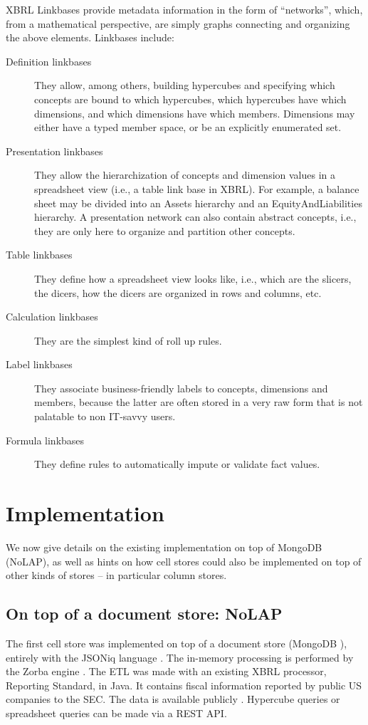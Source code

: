 \documentclass{acm_proc_article-sp}
\begin{document}
XBRL Linkbases provide metadata information in the form of ``networks'', which, from a mathematical perspective, are simply graphs connecting and organizing the above elements. Linkbases include:

\begin{description}
\item[Definition linkbases] They allow, among others, building hypercubes and specifying which concepts are bound to which hypercubes, which hypercubes have which dimensions, and which dimensions have which members. Dimensions may either have a typed member space, or be an explicitly enumerated set. 
\item[Presentation linkbases] They allow the hierarchization of concepts and dimension values in a spreadsheet view (i.e., a table link base in XBRL). For example, a balance sheet may be divided into an Assets hierarchy and an EquityAndLiabilities hierarchy. A presentation network can also contain abstract concepts, i.e., they are only here to organize and partition other concepts. 
\item[Table linkbases] They define how a spreadsheet view looks like, i.e., which are the slicers, the dicers, how the dicers are organized in rows and columns, etc.
\item[Calculation linkbases] They are the simplest kind of roll up rules.
\item[Label linkbases] They associate business-friendly labels to concepts, dimensions and members, because the latter are often stored in a very raw form that is not palatable to non IT-savvy users.
\item[Formula linkbases] They define rules to automatically impute or validate fact values.
\end{description}

\section{Implementation}
We now give details on the existing implementation on top of MongoDB (NoLAP), as well as hints on how cell stores could also be implemented on top of other kinds of stores -- in particular column stores.
\label{section-implementation}

\subsection{On top of a document store: NoLAP}

The first cell store was implemented on top of a document store (MongoDB \cite{MongoDB}), entirely with the JSONiq language \cite{JSONiq}. The in-memory processing is performed by the Zorba engine \cite{Zorba}. The ETL was made with an existing XBRL processor, Reporting Standard, in Java. It contains fiscal information reported by public US companies to the SEC. The data is available publicly \cite{SECXBRL.info}. Hypercube queries or spreadsheet queries can be made via a REST API.
\end{document}
